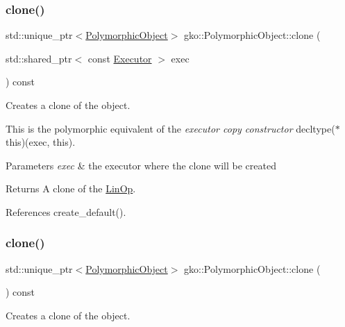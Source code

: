 \subsubsection{\texorpdfstring{clone()}{clone()}\hspace{0.1cm}{\footnotesize\ttfamily [1/2]}}
{\footnotesize\ttfamily std\+::unique\+\_\+ptr$<$\hyperlink{classgko_1_1PolymorphicObject}{Polymorphic\+Object}$>$ gko\+::\+Polymorphic\+Object\+::clone (\begin{DoxyParamCaption}\item[{std\+::shared\+\_\+ptr$<$ const \hyperlink{classgko_1_1Executor}{Executor} $>$}]{exec }\end{DoxyParamCaption}) const}



Creates a clone of the object. 

This is the polymorphic equivalent of the {\itshape executor copy constructor} {\ttfamily decltype($\ast$this)(exec, this)}.


\begin{DoxyParams}{Parameters}
{\em exec} & the executor where the clone will be created\\
\hline
\end{DoxyParams}
\begin{DoxyReturn}{Returns}
A clone of the \hyperlink{classgko_1_1LinOp}{Lin\+Op}. 
\end{DoxyReturn}


References create\+\_\+default().

\mbox{\label{classgko_1_1PolymorphicObject_a298c488bcb1906877a3584d88713ba81}} 
\subsubsection{\texorpdfstring{clone()}{clone()}\hspace{0.1cm}{\footnotesize\ttfamily [2/2]}}
{\footnotesize\ttfamily std\+::unique\+\_\+ptr$<$\hyperlink{classgko_1_1PolymorphicObject}{Polymorphic\+Object}$>$ gko\+::\+Polymorphic\+Object\+::clone (\begin{DoxyParamCaption}{ }\end{DoxyParamCaption}) const}



Creates a clone of the object. 

